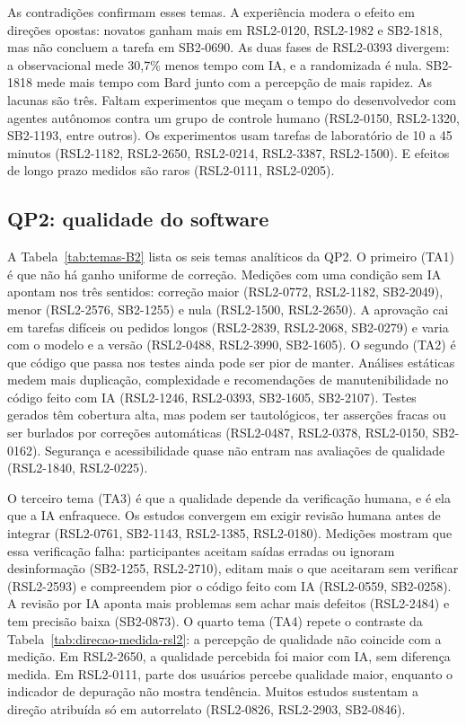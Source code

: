 As contradições confirmam esses temas. A experiência modera o efeito em
direções opostas: novatos ganham mais em RSL2-0120, RSL2-1982 e SB2-1818, mas
não concluem a tarefa em SB2-0690. As duas fases de RSL2-0393 divergem: a
observacional mede 30,7\% menos tempo com IA, e a randomizada é nula. SB2-1818 mede mais tempo com Bard junto com a percepção de mais
rapidez. As lacunas são três. Faltam experimentos que meçam o tempo do desenvolvedor com
agentes autônomos contra um grupo de controle humano (RSL2-0150, RSL2-1320,
SB2-1193, entre outros). Os experimentos usam tarefas de laboratório de 10 a
45 minutos (RSL2-1182, RSL2-2650, RSL2-0214, RSL2-3387, RSL2-1500). E efeitos
de longo prazo medidos são raros (RSL2-0111, RSL2-0205).

\subsection{QP2: qualidade do software}
\label{sec:resultados-rsl2-qp2}



A Tabela~\ref{tab:temas-B2} lista os seis temas analíticos da QP2. O primeiro
(TA1) é que não há ganho uniforme de correção. Medições com uma condição sem
IA apontam nos três sentidos: correção maior (RSL2-0772, RSL2-1182,
SB2-2049), menor (RSL2-2576, SB2-1255) e nula (RSL2-1500, RSL2-2650). A
aprovação cai em tarefas difíceis ou pedidos longos (RSL2-2839, RSL2-2068,
SB2-0279) e varia com o modelo e a versão (RSL2-0488, RSL2-3990, SB2-1605).
O segundo (TA2) é que código que passa nos testes ainda pode ser pior de
manter. Análises estáticas medem mais duplicação, complexidade e
recomendações de manutenibilidade no código feito com IA (RSL2-1246,
RSL2-0393, SB2-1605, SB2-2107). Testes gerados têm cobertura alta, mas podem
ser tautológicos, ter asserções fracas ou ser burlados por correções
automáticas (RSL2-0487, RSL2-0378, RSL2-0150, SB2-0162). Segurança e
acessibilidade quase não entram nas avaliações de qualidade (RSL2-1840,
RSL2-0225).

O terceiro tema (TA3) é que a qualidade depende da verificação humana, e é
ela que a IA enfraquece. Os estudos convergem em exigir revisão humana antes
de integrar (RSL2-0761, SB2-1143, RSL2-1385, RSL2-0180). Medições mostram que
essa verificação falha: participantes aceitam saídas erradas ou ignoram
desinformação (SB2-1255, RSL2-2710), editam mais o que aceitaram sem
verificar (RSL2-2593) e compreendem pior o código feito com IA (RSL2-0559,
SB2-0258). A revisão por IA aponta mais problemas sem achar mais defeitos
(RSL2-2484) e tem precisão baixa (SB2-0873). O quarto tema (TA4) repete o
contraste da Tabela~\ref{tab:direcao-medida-rsl2}: a percepção de qualidade
não coincide com a medição. Em RSL2-2650, a qualidade percebida foi maior com
IA, sem diferença medida. Em RSL2-0111, parte dos usuários percebe qualidade
maior, enquanto o indicador de depuração não mostra tendência. Muitos estudos
sustentam a direção atribuída só em autorrelato (RSL2-0826, RSL2-2903,
SB2-0846).

